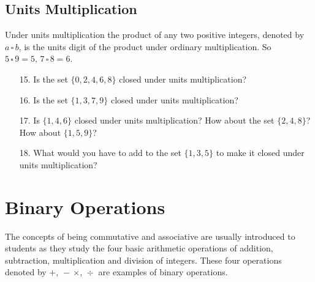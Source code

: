 \documentclass[12pt]{book}
\theoremstyle{definition}
\begin{document}
\subsection{Units Multiplication}

Under units multiplication the product of any two positive integers, denoted by $a\,\square\, b$, is the units digit of the product under ordinary multiplication.  So $5\,\square\,9=5,\, 7\,\square\,8=6$.
\begin{enumerate}
\item[15.] Is the set $\{0,2,4,6,8\}$ closed under units multiplication?
\item[16.]Is the set $\{1,3,7,9\}$ closed under units multiplication?
\item[17.]Is $\{1,4,6\}$ closed under units multiplication?  How about the set $\{2,4,8\}$?  How about $\{1,5,9\}$?
\item[18.]What would you have to add to the set $\{1,3,5\}$ to make it closed under units multiplication?
\end{enumerate}


\section{Binary Operations}
\quad The concepts of being commutative and associative are usually introduced to students as they study the four basic arithmetic operations of addition, subtraction, multiplication and division of integers.  These four operations denoted by $+,\,-\,\times,\, \div$ are examples of binary operations.\\[.1in]
\end{document}
